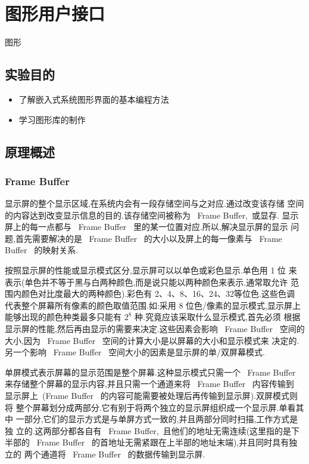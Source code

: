 \chapter{图形用户接口}{图形}

\section{实验目的}
\begin{itemize}\itemsep=-3pt
  \item 了解嵌入式系统图形界面的基本编程方法
  \item 学习图形库的制作
\end{itemize}

\section{原理概述}
\subsection{Frame Buffer}
	显示屏的整个显示区域,在系统内会有一段存储空间与之对应.通过改变该存储
空间的内容达到改变显示信息的目的.该存储空间被称为 ~Frame Buffer,~或显存.
显示屏上的每一点都与 ~Frame Buffer~ 里的某一位置对应.所以,解决显示屏的显示
问题,首先需要解决的是 ~Frame Buffer~ 的大小以及屏上的每一像素与 ~Frame
Buffer~ 的映射关系.

	按照显示屏的性能或显示模式区分,显示屏可以以单色或彩色显示.单色用 1 位
来表示(单色并不等于黑与白两种颜色,而是说只能以两种颜色来表示.通常取允许
范围内颜色对比度最大的两种颜色).彩色有 2、4、8、16、24、32等位色.这些色调
代表整个屏幕所有像素的颜色取值范围.如:采用 8 位色/像素的显示模式,显示屏上
能够出现的颜色种类最多只能有 $2^8$ 种.究竟应该采取什么显示模式,首先必须
根据显示屏的性能,然后再由显示的需要来决定.这些因素会影响 ~Frame Buffer~
空间的大小,因为 ~Frame Buffer~ 空间的计算大小是以屏幕的大小和显示模式来
决定的.另一个影响 ~Frame Buffer~ 空间大小的因素是显示屏的单/双屏幕模式.

	单屏模式表示屏幕的显示范围是整个屏幕.这种显示模式只需一个 ~Frame Buffer~
来存储整个屏幕的显示内容,并且只需一个通道来将 ~Frame Buffer~ 内容传输到
显示屏上~(Frame Buffer~ 的内容可能需要被处理后再传输到显示屏).双屏模式则将
整个屏幕划分成两部分.它有别于将两个独立的显示屏组织成一个显示屏.单看其中
一部分,它们的显示方式是与单屏方式一致的,并且两部分同时扫描,工作方式是独
立的.这两部分都各自有 ~Frame Buffer,~且他们的地址无需连续(这里指的是下
半部的 ~Frame Buffer~ 的首地址无需紧跟在上半部的地址末端),并且同时具有独立的
两个通道将 ~Frame Buffer~ 的数据传输到显示屏.


